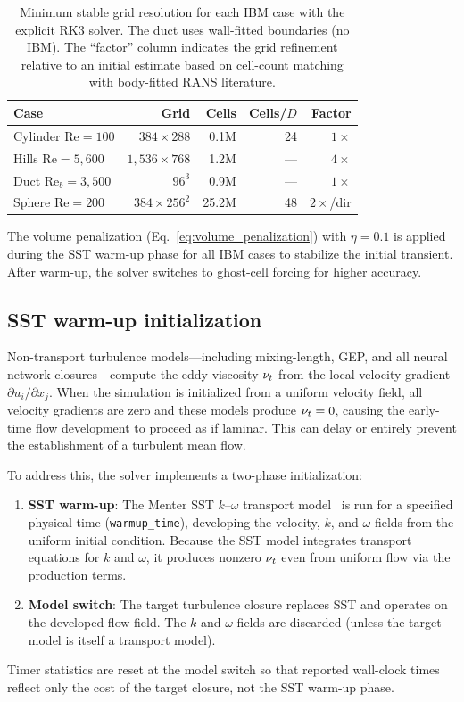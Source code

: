 \begin{table}[htbp]
\centering
\caption{Minimum stable grid resolution for each IBM case with the explicit RK3 solver. The duct uses wall-fitted boundaries (no IBM). The ``factor'' column indicates the grid refinement relative to an initial estimate based on cell-count matching with body-fitted RANS literature.}
\label{tab:ibm_min_grid}
\begin{tabular}{lrrrr}
\toprule
Case & Grid & Cells & Cells/$D$ & Factor \\
\midrule
Cylinder Re${=}100$ & $384 \times 288$ & 0.1M & 24 & $1\times$ \\
Hills Re${=}5{,}600$ & $1{,}536 \times 768$ & 1.2M & --- & $4\times$ \\
Duct Re$_b{=}3{,}500$ & $96^3$ & 0.9M & --- & $1\times$ \\
Sphere Re${=}200$ & $384 \times 256^2$ & 25.2M & 48 & $2\times$/dir \\
\bottomrule
\end{tabular}
\end{table}

The volume penalization (Eq.~\ref{eq:volume_penalization}) with $\eta = 0.1$ is applied during the SST warm-up phase for all IBM cases to stabilize the initial transient.
After warm-up, the solver switches to ghost-cell forcing for higher accuracy.

\subsection{SST warm-up initialization}
\label{sec:sst_warmup}

Non-transport turbulence models---including mixing-length, GEP, and all neural network closures---compute the eddy viscosity $\nu_t$ from the local velocity gradient $\partial u_i / \partial x_j$.
When the simulation is initialized from a uniform velocity field, all velocity gradients are zero and these models produce $\nu_t = 0$, causing the early-time flow development to proceed as if laminar.
This can delay or entirely prevent the establishment of a turbulent mean flow.

To address this, the solver implements a two-phase initialization:
\begin{enumerate}
    \item \textbf{SST warm-up}: The Menter SST $k$--$\omega$ transport model~\citep{Menter1994} is run for a specified physical time (\texttt{warmup\_time}), developing the velocity, $k$, and $\omega$ fields from the uniform initial condition. Because the SST model integrates transport equations for $k$ and $\omega$, it produces nonzero $\nu_t$ even from uniform flow via the production terms.
    \item \textbf{Model switch}: The target turbulence closure replaces SST and operates on the developed flow field. The $k$ and $\omega$ fields are discarded (unless the target model is itself a transport model).
\end{enumerate}
Timer statistics are reset at the model switch so that reported wall-clock times reflect only the cost of the target closure, not the SST warm-up phase.

